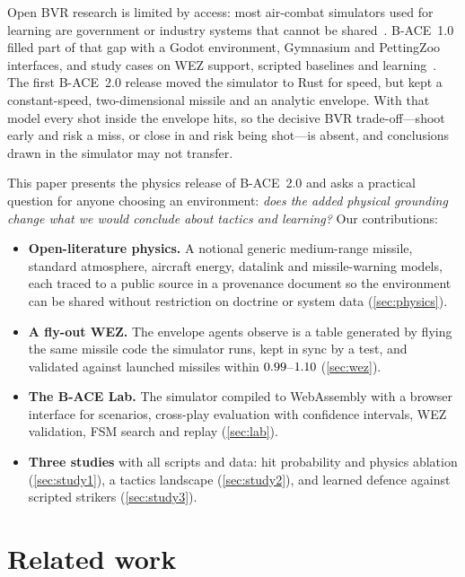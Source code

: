 \documentclass[11pt,a4paper]{article}
\begin{document}
Open BVR research is limited by access: most air-combat simulators used for learning are government or industry systems that cannot be shared~\cite{gorton2024survey,kuroswiski2024bace}.
B-ACE~1.0 filled part of that gap with a Godot environment, Gymnasium and PettingZoo interfaces, and study cases on WEZ support, scripted baselines and learning~\cite{kuroswiski2024bace,kuroswiski2023beyond,dantas2021wez}.
The first B-ACE~2.0 release moved the simulator to Rust for speed, but kept a constant-speed, two-dimensional missile and an analytic envelope.
With that model every shot inside the envelope hits, so the decisive BVR trade-off---shoot early and risk a miss, or close in and risk being shot---is absent, and conclusions drawn in the simulator may not transfer.

This paper presents the physics release of B-ACE~2.0 and asks a practical question for anyone choosing an environment: \emph{does the added physical grounding change what we would conclude about tactics and learning?}
Our contributions:
\begin{itemize}
\item \textbf{Open-literature physics.} A notional generic medium-range missile, standard atmosphere, aircraft energy, datalink and missile-warning models, each traced to a public source in a provenance document so the environment can be shared without restriction on doctrine or system data (\cref{sec:physics}).
\item \textbf{A fly-out WEZ.} The envelope agents observe is a table generated by flying the same missile code the simulator runs, kept in sync by a test, and validated against launched missiles within $0.99$--$1.10$ (\cref{sec:wez}).
\item \textbf{The B-ACE Lab.} The simulator compiled to WebAssembly with a browser interface for scenarios, cross-play evaluation with confidence intervals, WEZ validation, FSM search and replay (\cref{sec:lab}).
\item \textbf{Three studies} with all scripts and data: hit probability and physics ablation (\cref{sec:study1}), a tactics landscape (\cref{sec:study2}), and learned defence against scripted strikers (\cref{sec:study3}).
\end{itemize}

\section{Related work}
\end{document}
